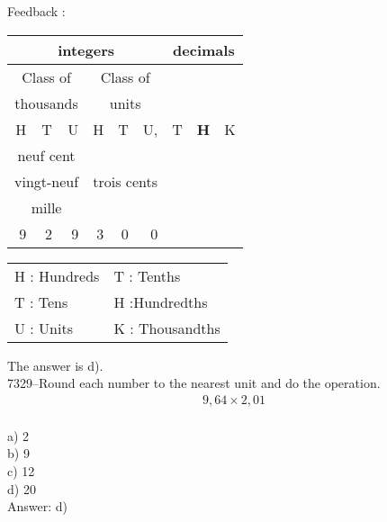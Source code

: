 \documentclass[letterpaper, 12pt]{article}
\begin{document}
Feedback :\\
\begin{center}
\begin{tabular}{|rrr|rrr|rrr|}
\hline
\multicolumn{6}{|c|}{integers} &\multicolumn{3}{|c|}{decimals} \\
\hline
\multicolumn{3}{|c|}{Class of} &\multicolumn{3}{|c|}{Class of} &  \multicolumn{3}{c|}{} \\
\multicolumn{3}{|c|}{thousands} &\multicolumn{3}{|c|}{units} &  \multicolumn{3}{c|}{} \\
\hline
H & T & U &H & T & U, & T\up{th} & \textbf{H\up{th}} & K\up{th} \\
\hline
\hline
\multicolumn{3}{|c|}{neuf cent} &  \multicolumn{3}{|c|}{} & & &\\
\multicolumn{3}{|c|}{vingt-neuf} &  \multicolumn{3}{|c|}{trois cents} & & &\\
\multicolumn{3}{|c|}{mille} &  \multicolumn{3}{|c|}{} & & &\\
 9 & 2 & 9 & 3 & 0 & 0 & & &\\
\hline
\end{tabular}
\end{center}

\tiny
\begin{center}
\begin{tabular}{ll}
H : Hundreds & T\up{th} : Tenths\\
T : Tens & H\up{th} :Hundredths\\
U : Units & K\up{e} : Thousandths\\
\end{tabular}
\end{center}

\normalsize

The answer is d).\\




7329--Round each number to the nearest unit and do the operation.\\

\begin{eqnarray*}
9,64 \times 2,01\\
\end{eqnarray*}

a) 2\\
b) 9\\
c) 12\\
d) 20\\

Answer: d)
\end{document}

